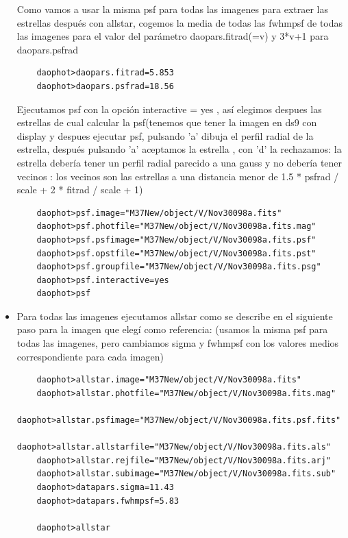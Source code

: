 \documentclass{article}
\begin{document}
\begin{itemize}
Como vamos a usar la misma psf para todas las imagenes para extraer las estrellas después con allstar, cogemos la media de todas las fwhmpsf de todas las imagenes para el valor del parámetro daopars.fitrad(=v) y 3*v+1 para daopars.psfrad

\begin{verbatim}
	daophot>daopars.fitrad=5.853
	daophot>daopars.psfrad=18.56
\end{verbatim}

Ejecutamos psf con la opción interactive = yes , así elegimos despues las estrellas  de cual calcular la psf(tenemos que tener la imagen en ds9 con display y despues ejecutar psf, 
pulsando 'a' dibuja el perfil radial de la estrella, 
después pulsando 'a' aceptamos la estrella , con 'd' la rechazamos: 
la estrella debería tener un perfil radial parecido a una gauss y no debería tener vecinos : los vecinos son las estrellas a una distancia menor de 1.5 * psfrad / scale + 2 * fitrad / scale + 1) 

\begin{verbatim}
	daophot>psf.image="M37New/object/V/Nov30098a.fits"
	daophot>psf.photfile="M37New/object/V/Nov30098a.fits.mag"
	daophot>psf.psfimage="M37New/object/V/Nov30098a.fits.psf"
	daophot>psf.opstfile="M37New/object/V/Nov30098a.fits.pst"
	daophot>psf.groupfile="M37New/object/V/Nov30098a.fits.psg"
	daophot>psf.interactive=yes
	daophot>psf

\end{verbatim}



\item Para todas las imagenes ejecutamos allstar como se describe en el siguiente paso para la imagen que elegí como referencia:
(usamos la misma psf para todas las imagenes, pero cambiamos sigma y fwhmpsf con los valores medios correspondiente para cada imagen)

\begin{verbatim}
	daophot>allstar.image="M37New/object/V/Nov30098a.fits"
	daophot>allstar.photfile="M37New/object/V/Nov30098a.fits.mag"
	daophot>allstar.psfimage="M37New/object/V/Nov30098a.fits.psf.fits"
	daophot>allstar.allstarfile="M37New/object/V/Nov30098a.fits.als"
	daophot>allstar.rejfile="M37New/object/V/Nov30098a.fits.arj"
	daophot>allstar.subimage="M37New/object/V/Nov30098a.fits.sub"
	daophot>datapars.sigma=11.43
	daophot>datapars.fwhmpsf=5.83

	daophot>allstar
	
\end{verbatim}


\end{itemize}
\end{document}
